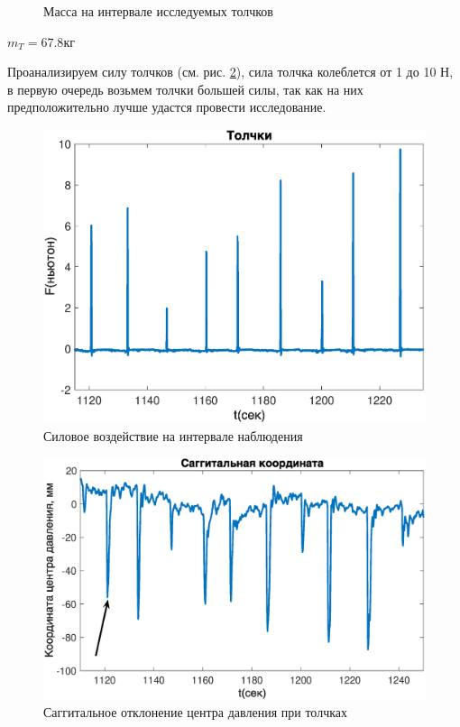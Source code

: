 \documentclass[a4paper,12pt, openany]{book}
\theoremstyle{plain} %
\theoremstyle{definition} %
\theoremstyle{remark} %
\numberwithin{equation}{chapter}
\begin{document}
{\begin{figure}[h!]
\begin{center}
\begin{minipage}[h]{0.49\linewidth}
            \caption{Масса на интервале исследуемых толчков}
            \label{mass_short_time}
        \end{minipage}
    \end{center}
\end{figure}

$m_T=67.8$кг

Проанализируем силу толчков (см. рис. \ref{pushes_real}), сила толчка колеблется от 1 до 10 Н,
в первую очередь возьмем толчки большей силы, так как на них предположительно лучше удастся провести исследование.

\begin{figure}[h!]
    \centering
    \includegraphics[width=0.9\linewidth]{pushes_real.eps}
    \caption{Силовое воздействие на интервале наблюдения}
    \label{pushes_real}
\end{figure}

\begin{figure}[h!]
    \centering
    \includegraphics[width=0.9\linewidth]{y_real.eps}
    \caption{Саггитальное отклонение центра давления при толчках}
    \label{y_real}
\end{figure}



}
\end{document}
